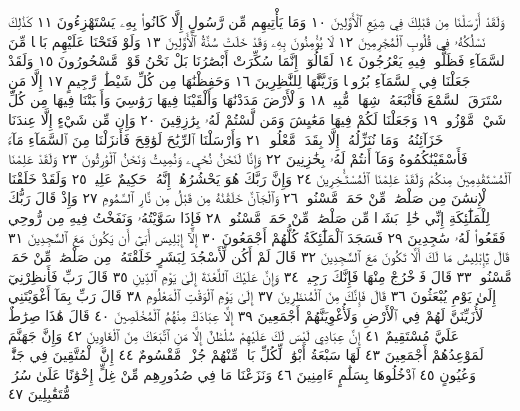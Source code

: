 وَلَقَدْ أَرْسَلْنَا مِن قَبْلِكَ فِي شِيَعِ ٱلْأَوَّلِينَ ١٠ وَمَا يَأْتِيهِم
مِّن رَّسُولٍ إِلَّا كَانُوا۟ بِهِۦ يَسْتَهْزِءُونَ ١١ كَذَٰلِكَ نَسْلُكُهُۥ
فِي قُلُوبِ ٱلْمُجْرِمِينَ ١٢ لَا يُؤْمِنُونَ بِهِۦ وَقَدْ خَلَتْ سُنَّةُ ٱلْأَوَّلِينَ ١٣
وَلَوْ فَتَحْنَا عَلَيْهِم بَابࣰا مِّنَ ٱلسَّمَآءِ فَظَلُّوا۟ فِيهِ يَعْرُجُونَ ١٤
لَقَالُوٓا۟ إِنَّمَا سُكِّرَتْ أَبْصَٰرُنَا بَلْ نَحْنُ قَوْمࣱ مَّسْحُورُونَ ١٥
وَلَقَدْ جَعَلْنَا فِي ٱلسَّمَآءِ بُرُوجࣰا وَزَيَّنَّٰهَا لِلنَّٰظِرِينَ ١٦
وَحَفِظْنَٰهَا مِن كُلِّ شَيْطَٰنࣲ رَّجِيمٍ ١٧ إِلَّا مَنِ ٱسْتَرَقَ ٱلسَّمْعَ
فَأَتْبَعَهُۥ شِهَابࣱ مُّبِينࣱ ١٨ وَٱلْأَرْضَ مَدَدْنَٰهَا وَأَلْقَيْنَا فِيهَا
رَوَٰسِيَ وَأَنۢبَتْنَا فِيهَا مِن كُلِّ شَيْءࣲ مَّوْزُونࣲ ١٩ وَجَعَلْنَا لَكُمْ
فِيهَا مَعَٰيِشَ وَمَن لَّسْتُمْ لَهُۥ بِرَٰزِقِينَ ٢٠ وَإِن مِّن شَيْءٍ إِلَّا
عِندَنَا خَزَآئِنُهُۥ وَمَا نُنَزِّلُهُۥٓ إِلَّا بِقَدَرࣲ مَّعْلُومࣲ ٢١ وَأَرْسَلْنَا
ٱلرِّيَٰحَ لَوَٰقِحَ فَأَنزَلْنَا مِنَ ٱلسَّمَآءِ مَآءࣰ فَأَسْقَيْنَٰكُمُوهُ وَمَآ أَنتُمْ
لَهُۥ بِخَٰزِنِينَ ٢٢ وَإِنَّا لَنَحْنُ نُحْيِۦ وَنُمِيتُ وَنَحْنُ ٱلْوَٰرِثُونَ ٢٣
وَلَقَدْ عَلِمْنَا ٱلْمُسْتَقْدِمِينَ مِنكُمْ وَلَقَدْ عَلِمْنَا ٱلْمُسْتَـْٔخِرِينَ ٢٤
وَإِنَّ رَبَّكَ هُوَ يَحْشُرُهُمْۚ إِنَّهُۥ حَكِيمٌ عَلِيمࣱ ٢٥ وَلَقَدْ خَلَقْنَا
ٱلْإِنسَٰنَ مِن صَلْصَٰلࣲ مِّنْ حَمَإࣲ مَّسْنُونࣲ ٢٦ وَٱلْجَآنَّ خَلَقْنَٰهُ مِن
قَبْلُ مِن نَّارِ ٱلسَّمُومِ ٢٧ وَإِذْ قَالَ رَبُّكَ لِلْمَلَٰٓئِكَةِ إِنِّي خَٰلِقُۢ بَشَرࣰا
مِّن صَلْصَٰلࣲ مِّنْ حَمَإࣲ مَّسْنُونࣲ ٢٨ فَإِذَا سَوَّيْتُهُۥ وَنَفَخْتُ فِيهِ
مِن رُّوحِي فَقَعُوا۟ لَهُۥ سَٰجِدِينَ ٢٩ فَسَجَدَ ٱلْمَلَٰٓئِكَةُ كُلُّهُمْ
أَجْمَعُونَ ٣٠ إِلَّآ إِبْلِيسَ أَبَىٰٓ أَن يَكُونَ مَعَ ٱلسَّٰجِدِينَ ٣١
قَالَ يَٰٓإِبْلِيسُ مَا لَكَ أَلَّا تَكُونَ مَعَ ٱلسَّٰجِدِينَ ٣٢ قَالَ لَمْ أَكُن
لِّأَسْجُدَ لِبَشَرٍ خَلَقْتَهُۥ مِن صَلْصَٰلࣲ مِّنْ حَمَإࣲ مَّسْنُونࣲ ٣٣
قَالَ فَٱخْرُجْ مِنْهَا فَإِنَّكَ رَجِيمࣱ ٣٤ وَإِنَّ عَلَيْكَ ٱللَّعْنَةَ إِلَىٰ يَوْمِ
ٱلدِّينِ ٣٥ قَالَ رَبِّ فَأَنظِرْنِيٓ إِلَىٰ يَوْمِ يُبْعَثُونَ ٣٦ قَالَ فَإِنَّكَ
مِنَ ٱلْمُنظَرِينَ ٣٧ إِلَىٰ يَوْمِ ٱلْوَقْتِ ٱلْمَعْلُومِ ٣٨ قَالَ رَبِّ بِمَآ
أَغْوَيْتَنِي لَأُزَيِّنَنَّ لَهُمْ فِي ٱلْأَرْضِ وَلَأُغْوِيَنَّهُمْ أَجْمَعِينَ ٣٩
إِلَّا عِبَادَكَ مِنْهُمُ ٱلْمُخْلَصِينَ ٤٠ قَالَ هَٰذَا صِرَٰطٌ عَلَيَّ
مُسْتَقِيمٌ ٤١ إِنَّ عِبَادِي لَيْسَ لَكَ عَلَيْهِمْ سُلْطَٰنٌ إِلَّا مَنِ
ٱتَّبَعَكَ مِنَ ٱلْغَاوِينَ ٤٢ وَإِنَّ جَهَنَّمَ لَمَوْعِدُهُمْ أَجْمَعِينَ ٤٣
لَهَا سَبْعَةُ أَبْوَٰبࣲ لِّكُلِّ بَابࣲ مِّنْهُمْ جُزْءࣱ مَّقْسُومٌ ٤٤ إِنَّ
ٱلْمُتَّقِينَ فِي جَنَّٰتࣲ وَعُيُونٍ ٤٥ ٱدْخُلُوهَا بِسَلَٰمٍ ءَامِنِينَ ٤٦
وَنَزَعْنَا مَا فِي صُدُورِهِم مِّنْ غِلٍّ إِخْوَٰنًا عَلَىٰ سُرُرࣲ مُّتَقَٰبِلِينَ ٤٧
